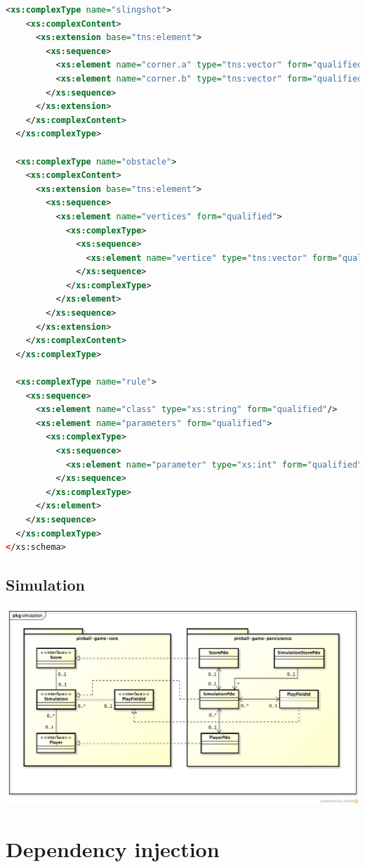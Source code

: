 \documentclass[fontsize=12pt,
               paper=a4,
               twoside=false,
               parskip=half,
               ]{scrartcl}
\begin{document}
\begin{lstlisting}[language=xml,label=lst:default_playfield,caption={schema for playfields.xml}]
  <xs:complexType name="slingshot">
    <xs:complexContent>
      <xs:extension base="tns:element">
        <xs:sequence>
          <xs:element name="corner.a" type="tns:vector" form="qualified"/>
          <xs:element name="corner.b" type="tns:vector" form="qualified"/>
        </xs:sequence>
      </xs:extension>
    </xs:complexContent>
  </xs:complexType>

  <xs:complexType name="obstacle">
    <xs:complexContent>
      <xs:extension base="tns:element">
        <xs:sequence>
          <xs:element name="vertices" form="qualified">
            <xs:complexType>
              <xs:sequence>
                <xs:element name="vertice" type="tns:vector" form="qualified" maxOccurs="unbounded"/>
              </xs:sequence>
            </xs:complexType>
          </xs:element>
        </xs:sequence>
      </xs:extension>
    </xs:complexContent>
  </xs:complexType>

  <xs:complexType name="rule">
    <xs:sequence>
      <xs:element name="class" type="xs:string" form="qualified"/>
      <xs:element name="parameters" form="qualified">
        <xs:complexType>
          <xs:sequence>
            <xs:element name="parameter" type="xs:int" form="qualified" maxOccurs="unbounded"/>
          </xs:sequence>
        </xs:complexType>
      </xs:element>
    </xs:sequence>
  </xs:complexType>
</xs:schema>
\end{lstlisting}


\subsection{Simulation}

\includegraphics[width=15.5cm]{./img/persistence-simulation.png}



\section{Dependency injection}
\end{document}
